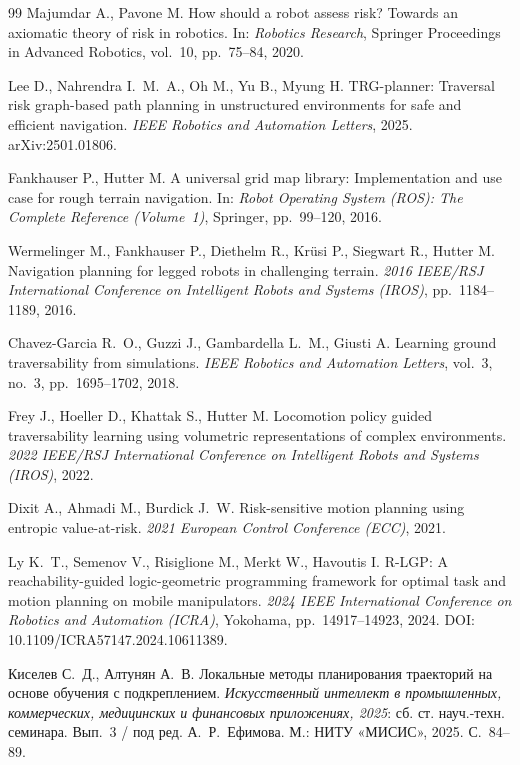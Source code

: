 \documentclass{misisarticle}
\begin{document}
\begin{thebibliography}{99}
 Majumdar A., Pavone M. How should a robot assess risk? Towards an axiomatic theory of risk in robotics. In: \textit{Robotics Research}, Springer Proceedings in Advanced Robotics, vol.~10, pp.~75--84, 2020.

 Lee D., Nahrendra I.~M.~A., Oh M., Yu B., Myung H. TRG-planner: Traversal risk graph-based path planning in unstructured environments for safe and efficient navigation. \textit{IEEE Robotics and Automation Letters}, 2025. arXiv:2501.01806.

 Fankhauser P., Hutter M. A universal grid map library: Implementation and use case for rough terrain navigation. In: \textit{Robot Operating System (ROS): The Complete Reference (Volume~1)}, Springer, pp.~99--120, 2016.

 Wermelinger M., Fankhauser P., Diethelm R., Krüsi P., Siegwart R., Hutter M. Navigation planning for legged robots in challenging terrain. \textit{2016 IEEE/RSJ International Conference on Intelligent Robots and Systems (IROS)}, pp.~1184--1189, 2016.

 Chavez-Garcia R.~O., Guzzi J., Gambardella L.~M., Giusti A. Learning ground traversability from simulations. \textit{IEEE Robotics and Automation Letters}, vol.~3, no.~3, pp.~1695--1702, 2018.

 Frey J., Hoeller D., Khattak S., Hutter M. Locomotion policy guided traversability learning using volumetric representations of complex environments. \textit{2022 IEEE/RSJ International Conference on Intelligent Robots and Systems (IROS)}, 2022.

 Dixit A., Ahmadi M., Burdick J.~W. Risk-sensitive motion planning using entropic value-at-risk. \textit{2021 European Control Conference (ECC)}, 2021.

 Ly K.~T., Semenov V., Risiglione M., Merkt W., Havoutis I. R-LGP: A reachability-guided logic-geometric programming framework for optimal task and motion planning on mobile manipulators. \textit{2024 IEEE International Conference on Robotics and Automation (ICRA)}, Yokohama, pp.~14917--14923, 2024. DOI: 10.1109/ICRA57147.2024.10611389.

 Киселев С.~Д., Алтунян А.~В. Локальные методы планирования траекторий на основе обучения с подкреплением. \textit{Искусственный интеллект в промышленных, коммерческих, медицинских и финансовых приложениях, 2025}: сб. ст. науч.-техн. семинара. Вып.~3 / под ред. А.~Р.~Ефимова. М.: НИТУ «МИСИС», 2025. С.~84--89.


\end{thebibliography}
\end{document}
